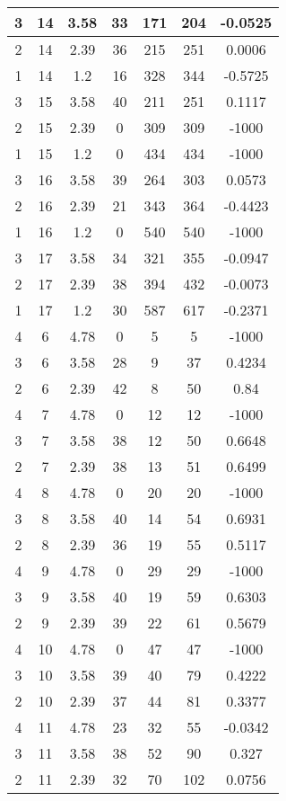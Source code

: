 \documentclass[letterpaper, 12pt]{article}
\begin{document}
\begin{longtable}{|c|c|c|c|c|c|c|}
\hline
3 & 14 & 3.58 & 33 & 171 & 204 & -0.0525 \\
\hline
2 & 14 & 2.39 & 36 & 215 & 251 & 0.0006 \\
\hline
1 & 14 & 1.2 & 16 & 328 & 344 & -0.5725 \\
\hline
3 & 15 & 3.58 & 40 & 211 & 251 & 0.1117 \\
\hline
2 & 15 & 2.39 & 0 & 309 & 309 & -1000 \\
\hline
1 & 15 & 1.2 & 0 & 434 & 434 & -1000 \\
\hline
3 & 16 & 3.58 & 39 & 264 & 303 & 0.0573 \\
\hline
2 & 16 & 2.39 & 21 & 343 & 364 & -0.4423 \\
\hline
1 & 16 & 1.2 & 0 & 540 & 540 & -1000 \\
\hline
3 & 17 & 3.58 & 34 & 321 & 355 & -0.0947 \\
\hline
2 & 17 & 2.39 & 38 & 394 & 432 & -0.0073 \\
\hline
1 & 17 & 1.2 & 30 & 587 & 617 & -0.2371 \\
\hline
4 & 6 & 4.78 & 0 & 5 & 5 & -1000 \\
\hline
3 & 6 & 3.58 & 28 & 9 & 37 & 0.4234 \\
\hline
2 & 6 & 2.39 & 42 & 8 & 50 & 0.84 \\
\hline
4 & 7 & 4.78 & 0 & 12 & 12 & -1000 \\
\hline
3 & 7 & 3.58 & 38 & 12 & 50 & 0.6648 \\
\hline
2 & 7 & 2.39 & 38 & 13 & 51 & 0.6499 \\
\hline
4 & 8 & 4.78 & 0 & 20 & 20 & -1000 \\
\hline
3 & 8 & 3.58 & 40 & 14 & 54 & 0.6931 \\
\hline
2 & 8 & 2.39 & 36 & 19 & 55 & 0.5117 \\
\hline
4 & 9 & 4.78 & 0 & 29 & 29 & -1000 \\
\hline
3 & 9 & 3.58 & 40 & 19 & 59 & 0.6303 \\
\hline
2 & 9 & 2.39 & 39 & 22 & 61 & 0.5679 \\
\hline
4 & 10 & 4.78 & 0 & 47 & 47 & -1000 \\
\hline
3 & 10 & 3.58 & 39 & 40 & 79 & 0.4222 \\
\hline
2 & 10 & 2.39 & 37 & 44 & 81 & 0.3377 \\
\hline
4 & 11 & 4.78 & 23 & 32 & 55 & -0.0342 \\
\hline
3 & 11 & 3.58 & 38 & 52 & 90 & 0.327 \\
\hline
2 & 11 & 2.39 & 32 & 70 & 102 & 0.0756 \\

\end{longtable}
\end{document}
